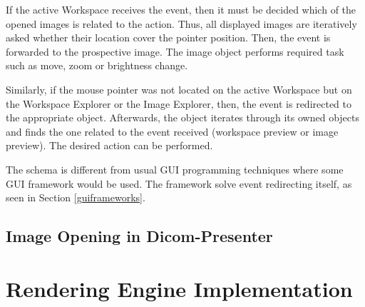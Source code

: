 If the active Workspace receives the event, then it must be decided which of the opened images is related to the action. Thus, all displayed images are iteratively asked whether their location cover the pointer position. Then, the event is forwarded to the prospective image. The image object performs required task such as move, zoom or brightness change.

Similarly, if the mouse pointer was not located on the active Workspace but on the Workspace Explorer or the Image Explorer, then, the event is redirected to the appropriate object. Afterwards, the object iterates through its owned objects and finds the one related to the event received (workspace preview or image preview). The desired action can be performed.

The schema is different from usual GUI programming techniques where some GUI framework would be used. The framework solve event redirecting itself, as seen in Section \ref{guiframeworks}.

\subsection{Image Opening in Dicom-Presenter}





\section{Rendering Engine Implementation}
